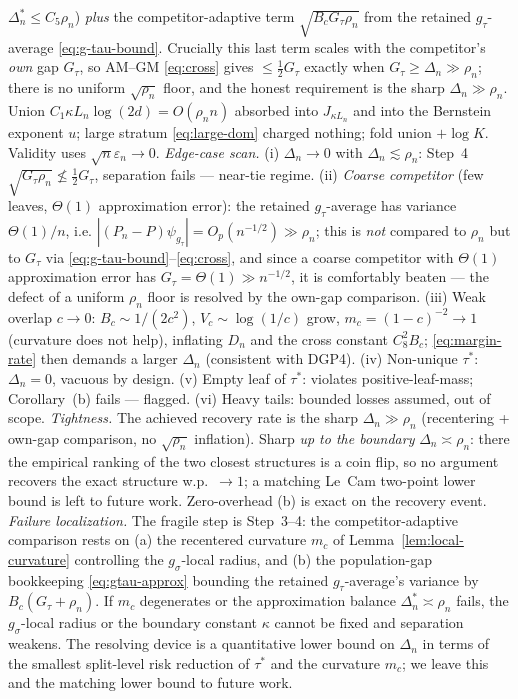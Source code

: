 \begin{remark}
$\Delta^\ast_n\le C_5\rho_n$) \emph{plus} the competitor-adaptive term
$\sqrt{B_c G_\tau\rho_n}$ from the retained $g_\tau$-average
\eqref{eq:g-tau-bound}. Crucially this last term scales with the competitor's
\emph{own} gap $G_\tau$, so AM--GM \eqref{eq:cross} gives $\le\tfrac12 G_\tau$
exactly when $G_\tau\ge\Delta_n\gg\rho_n$; there is no uniform $\sqrt{\rho_n}$
floor, and the honest requirement is the sharp $\Delta_n\gg\rho_n$. Union
$C_1\kappa L_n\log(2d)=O(\rho_n n)$ absorbed into $J_{\kappa L_n}$ and into the
Bernstein exponent $u$; large stratum \eqref{eq:large-dom} charged nothing; fold
union $+\log K$. Validity uses $\sqrt n\varepsilon_n\to0$.
\emph{Edge-case scan.} (i) $\Delta_n\to0$ with $\Delta_n\lesssim\rho_n$: Step~4
$\sqrt{G_\tau\rho_n}\not\le\tfrac12 G_\tau$, separation fails --- near-tie regime.
(ii) \emph{Coarse competitor} (few leaves, $\Theta(1)$ approximation error): the
retained $g_\tau$-average has variance $\Theta(1)/n$, i.e.
$|(P_n-P)\psi_{g_\tau}|=O_p(n^{-1/2})\gg\rho_n$; this is \emph{not} compared to
$\rho_n$ but to $G_\tau$ via \eqref{eq:g-tau-bound}--\eqref{eq:cross}, and since a
coarse competitor with $\Theta(1)$ approximation error has $G_\tau=\Theta(1)\gg
n^{-1/2}$, it is comfortably beaten --- the defect of a uniform $\rho_n$ floor is
resolved by the own-gap comparison. (iii) Weak overlap $c\to0$: $B_c\sim1/(2c^2)$,
$V_c\sim\log(1/c)$ grow, $m_c=(1-c)^{-2}\to1$ (curvature does not help), inflating
$D_n$ and the cross constant $C_8^2 B_c$; \eqref{eq:margin-rate} then demands a
larger $\Delta_n$ (consistent with DGP4). (iv) Non-unique $\tau^\ast$:
$\Delta_n=0$, vacuous by design. (v) Empty leaf of $\tau^\ast$: violates
positive-leaf-mass; Corollary~(b) fails --- flagged. (vi) Heavy tails: bounded
losses assumed, out of scope.
\emph{Tightness.} The achieved recovery rate is the sharp $\Delta_n\gg\rho_n$
(recentering + own-gap comparison, no $\sqrt{\rho_n}$ inflation). Sharp \emph{up
to the boundary} $\Delta_n\asymp\rho_n$: there the empirical ranking of the two
closest structures is a coin flip, so no argument recovers the exact structure
w.p.\ $\to1$; a matching Le~Cam two-point lower bound is left to future work.
Zero-overhead (b) is exact on the recovery event.
\emph{Failure localization.} The fragile step is Step~3--4: the competitor-adaptive
comparison rests on (a) the recentered curvature $m_c$ of
Lemma~\ref{lem:local-curvature} controlling the $g_\sigma$-local radius, and (b)
the population-gap bookkeeping \eqref{eq:gtau-approx} bounding the retained
$g_\tau$-average's variance by $B_c(G_\tau+\rho_n)$. If $m_c$ degenerates or the
approximation balance $\Delta^\ast_n\asymp\rho_n$ fails, the $g_\sigma$-local
radius or the boundary constant $\kappa$ cannot be fixed and separation weakens.
The resolving device is a quantitative lower bound on $\Delta_n$ in terms of the
smallest split-level risk reduction of $\tau^\ast$ and the curvature $m_c$; we
leave this and the matching lower bound to future work.
\end{remark}
